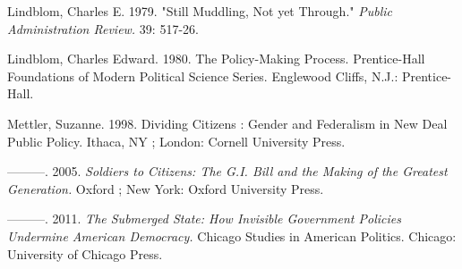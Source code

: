 








Lindblom, Charles E.  1979.  "Still Muddling, Not yet Through."  \textit{Public Administration Review.} 39: 517-26.

Lindblom, Charles Edward.  1980.  The Policy-Making Process.  Prentice-Hall Foundations of Modern Political Science Series.  Englewood Cliffs, N.J.: Prentice-Hall.





Mettler, Suzanne.  1998.  Dividing Citizens : Gender and Federalism in New Deal Public Policy.  Ithaca, NY ; London: Cornell University Press.

———.  2005.  \textit{Soldiers to Citizens: The G.I. Bill and the Making of the Greatest Generation.} Oxford ; New York: Oxford University Press.

———.  2011.  \textit{The Submerged State: How Invisible Government Policies Undermine American Democracy.} Chicago Studies in American Politics.  Chicago: University of Chicago Press.

